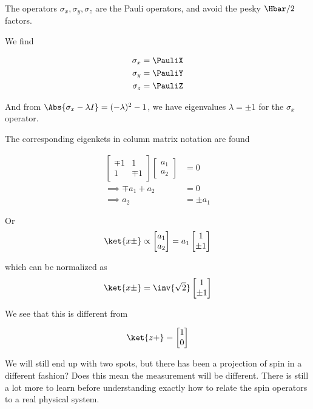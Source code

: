 The operators $\sigma_x, \sigma_y, \sigma_z$ are the Pauli operators, and avoid the pesky $\Hbar/2$ factors.

We find

\begin{align}\label{eqn:PHY356Foct19:2010}
\sigma_x &= \PauliX \\
\sigma_y &= \PauliY \\
\sigma_z &= \PauliZ
\end{align}

And from $\Abs{\sigma_x - \lambda I} = (-\lambda)^2 -1$, we have eigenvalues $\lambda = \pm 1$ for the $\sigma_x$ operator.

The corresponding eigenkets in column matrix notation are found

\begin{align*}
\begin{bmatrix}
\mp 1 & 1 \\
1 & \mp 1
\end{bmatrix}
\begin{bmatrix}
a_1 \\
a_2
\end{bmatrix}
&= 0 \\
\implies
\mp a_1 + a_2 &= 0 \\
\implies
a_2 &= \pm a_1
\end{align*}

Or
\begin{align*}
\ket{x\pm} \propto
\begin{bmatrix}
a_1 \\
a_2
\end{bmatrix}
=
a_1
\begin{bmatrix}
1 \\
\pm 1
\end{bmatrix}
\end{align*}

which can be normalized as
\begin{align}\label{eqn:PHY356Foct19:2011}
\ket{x\pm} =
\inv{\sqrt{2}}
\begin{bmatrix}
1 \\
\pm 1
\end{bmatrix}
\end{align}

We see that this is different from

\begin{align}\label{eqn:PHY356Foct19:2012}
\ket{z+} =
\begin{bmatrix}
1 \\
0
\end{bmatrix}
\end{align}

We will still end up with two spots, but there has been a projection of spin in a different fashion?  Does this mean the measurement will be different.  There is still a lot more to learn before understanding exactly how to relate the spin operators to a real physical system.

